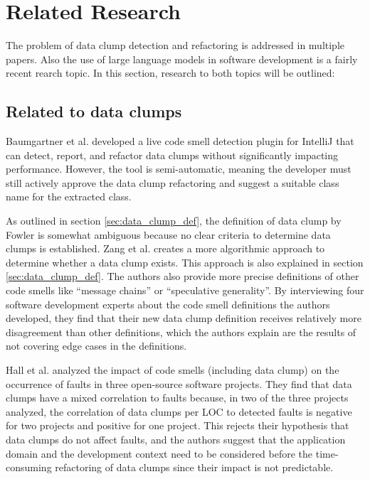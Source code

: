 \section{Related Research}\label{sec:related_research}
The problem of data clump detection and refactoring is addressed in multiple papers. Also the  use of large language models in software development is a fairly recent rearch topic. In this section, research to both topics will be outlined: 

\subsection{Related to data clumps}
Baumgartner et al. developed a live code smell detection plugin for IntelliJ that can detect, report, and refactor data clumps without significantly impacting performance. However, the tool is semi-automatic, meaning the developer must still actively approve the data clump refactoring and suggest a suitable class name for the extracted class. \cite{BaumgartnerAP23}

As outlined in section \ref{sec:data_clump_def}, the definition of data clump by Fowler \cite{fowler2019refactoring} is somewhat ambiguous because no clear criteria to determine data clumps is established. Zang et al. \cite{zhangImprovingPrecisionFowler2008} creates a more algorithmic approach to determine whether a data clump exists. This approach is also explained in section \ref{sec:data_clump_def}. The authors also provide more precise definitions of other code smells like \enquote{message chains} or \enquote{speculative generality}. By interviewing four software development experts about the code smell definitions the authors developed, they find that their new data clump definition receives relatively more disagreement than other definitions, which the authors explain are the results of not covering edge cases in the definitions. 


Hall et al. analyzed the impact of code smells (including data clump) on the occurrence of faults in three open-source software projects. They find that data clumps have a mixed correlation to faults because, in two of the three projects analyzed, the correlation of data clumps per \ac{LOC} to detected faults is negative for two projects and positive for one project. This rejects their hypothesis that data clumps do not affect faults, and the authors suggest that the application domain and the development context need to be considered before the time-consuming refactoring of data clumps since their impact is not predictable.  \cite{hallCodeSmellsHave2014}


